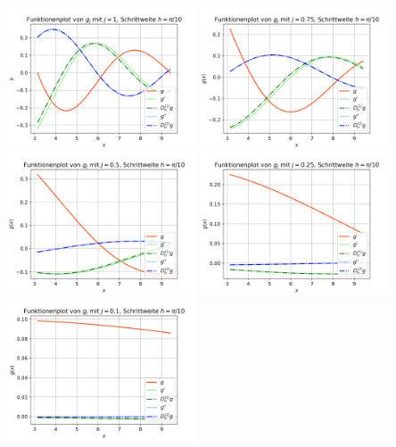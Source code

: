 \documentclass{scrartcl}
\begin{document}
{    \vspace{0.5cm}
    \includegraphics[width=0.42\textwidth]{Grafiken/Funktionenplot_j1_Pi_Zehntel}
    \includegraphics[width=0.42\textwidth]{Grafiken/Funktionenplot_j075_Pi_Zehntel}\\
    \includegraphics[width=0.42\textwidth]{Grafiken/Funktionenplot_j05_Pi_Zehntel}
    \includegraphics[width=0.42\textwidth]{Grafiken/Funktionenplot_j025_Pi_Zehntel}\\
    \includegraphics[width=0.42\textwidth]{Grafiken/Funktionenplot_j01_Pi_Zehntel}
}
\end{document}
